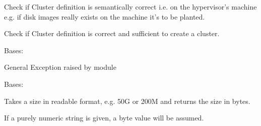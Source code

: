 \documentclass[a4paper,11pt,openany]{sphinxmanual}
\begin{document}
\begin{fulllineitems}

\begin{fulllineitems}
\label{ref-manual/XrdTest:XrdTest.ClusterUtils.Cluster.validateDynamic}
Check if Cluster definition is semantically correct i.e. on the
hypervisor's machine e.g. if disk images really exists on
the machine it's to be planted.

\end{fulllineitems}


\begin{fulllineitems}
\label{ref-manual/XrdTest:XrdTest.ClusterUtils.Cluster.validateStatic}
Check if Cluster definition is correct and sufficient
to create a cluster.

\end{fulllineitems}


\end{fulllineitems}


\begin{fulllineitems}
\label{ref-manual/XrdTest:XrdTest.ClusterUtils.ClusterManagerException}
Bases: 

General Exception raised by module

\end{fulllineitems}


\begin{fulllineitems}
\label{ref-manual/XrdTest:XrdTest.ClusterUtils.Disk}
Bases: 

\begin{fulllineitems}
\label{ref-manual/XrdTest:XrdTest.ClusterUtils.Disk.parseDiskSize}
Takes a size in readable format, e.g. 50G or 200M and returns the size in bytes.

If a purely numeric string is given, a byte value will be assumed.

\end{fulllineitems}


\end{fulllineitems}
\end{document}
